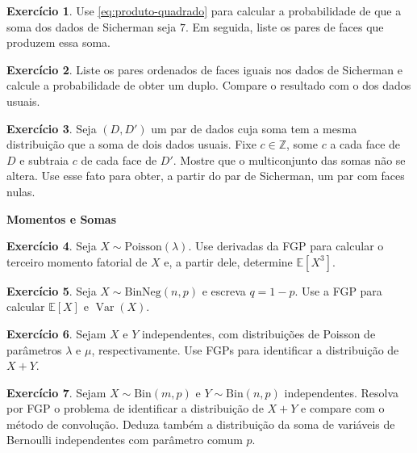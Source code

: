 \documentclass[12pt,portuguese]{article}
\theoremstyle{definition}
\theoremstyle{plainexercise}
\newtheorem{exercise}{Exercício}
\theoremstyle{starredexercise}
\theoremstyle{definition}
\begin{document}
\begin{exercise}\label{ex:sicherman-soma7}
Use \eqref{eq:produto-quadrado} para calcular a probabilidade de que a soma dos
dados de Sicherman seja $7$. Em seguida, liste os pares de faces que produzem
essa soma.
\end{exercise}

\begin{exercise}\label{ex:sicherman-duplos}
Liste os pares ordenados de faces iguais nos dados de Sicherman e calcule a
probabilidade de obter um duplo. Compare o resultado com o dos dados usuais.
\end{exercise}

\begin{exercise}\label{ex:sicherman-deslocamento}
Seja $(D,D')$ um par de dados cuja soma tem a mesma distribuição que a soma de
dois dados usuais. Fixe $c\in\mathbb{Z}$, some $c$ a cada face de $D$ e
subtraia $c$ de cada face de $D'$. Mostre que o multiconjunto das somas não se
altera. Use esse fato para obter, a partir do par de Sicherman, um par com
faces nulas.
\end{exercise}

\medskip
\noindent\textbf{Momentos e Somas}

\begin{exercise}\label{exercise:gw-4-30}
Seja $X\sim\mathrm{Poisson}(\lambda)$. Use derivadas da FGP para calcular o
terceiro momento fatorial de $X$ e, a partir dele, determine
$\mathbb{E}[X^3]$.
\end{exercise}

\begin{exercise}\label{exercise:gw-4-31}
Seja $X\sim\mathrm{BinNeg}(n,p)$ e escreva $q=1-p$. Use a FGP para calcular
$\mathbb{E}[X]$ e $\operatorname{Var}(X)$.
\end{exercise}

\begin{exercise}\label{exercise:gw-4-40}
Sejam $X$ e $Y$ independentes, com distribuições de Poisson de parâmetros
$\lambda$ e $\mu$, respectivamente. Use FGPs para identificar a distribuição
de $X+Y$.
\end{exercise}

\begin{exercise}\label{exercise:gw-4-41}
Sejam $X\sim\mathrm{Bin}(m,p)$ e $Y\sim\mathrm{Bin}(n,p)$ independentes.
Resolva por FGP o problema de identificar a distribuição de $X+Y$ e compare
com o método de convolução. Deduza também a distribuição da soma de variáveis
de Bernoulli independentes com parâmetro comum $p$.
\end{exercise}
\end{document}
